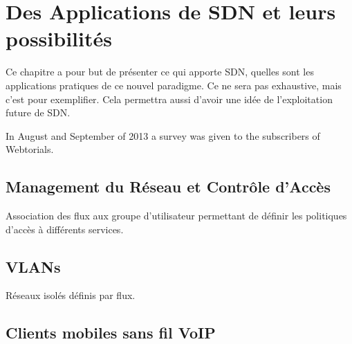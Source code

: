 
\chapter{Des Applications de SDN et leurs possibilités}

Ce chapitre a pour but de présenter ce qui apporte SDN, quelles sont les applications pratiques de ce nouvel paradigme. Ce ne sera pas exhaustive, mais c'est pour exemplifier. Cela permettra aussi d'avoir une idée de l'exploitation future de SDN.

In August and September of 2013 a survey was given to the subscribers of Webtorials.

\section{Management du Réseau et Contrôle d'Accès}
Association des flux aux groupe d'utilisateur permettant de définir les politiques d'accès à différents services.

\section{VLANs}
Réseaux isolés définis par flux.

\section{Clients mobiles sans fil VoIP}


